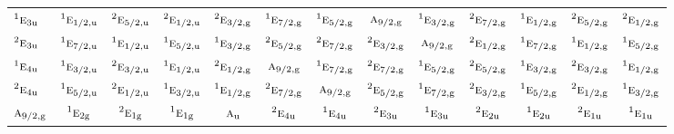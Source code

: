 \documentclass[10pt,a4paper]{article}
\numberwithin{equation}{section}
\newcommand{\irr}[1]{\text{\normalfont\scshape #1}}
\newcommand{\conjpair}[1]{{}^{#1}}
\newcommand{\ptag}[1]{\mathrm{#1}}
\begin{document}
{\begin{longtable}{@{}lcccccccccccc@{}}
$\conjpair{1}\irr{e}_{3\ptag{u}}$ & $\conjpair{1}\irr{e}_{1/2,\ptag{u}}$ & $\conjpair{2}\irr{e}_{5/2,\ptag{u}}$ & $\conjpair{2}\irr{e}_{1/2,\ptag{u}}$ & $\conjpair{2}\irr{e}_{3/2,\ptag{g}}$ & $\conjpair{1}\irr{e}_{7/2,\ptag{g}}$ & $\conjpair{1}\irr{e}_{5/2,\ptag{g}}$ & $\irr{a}_{9/2,\ptag{g}}$ & $\conjpair{1}\irr{e}_{3/2,\ptag{g}}$ & $\conjpair{2}\irr{e}_{7/2,\ptag{g}}$ & $\conjpair{1}\irr{e}_{1/2,\ptag{g}}$ & $\conjpair{2}\irr{e}_{5/2,\ptag{g}}$ & $\conjpair{2}\irr{e}_{1/2,\ptag{g}}$\\
$\conjpair{2}\irr{e}_{3\ptag{u}}$ & $\conjpair{1}\irr{e}_{7/2,\ptag{u}}$ & $\conjpair{1}\irr{e}_{1/2,\ptag{u}}$ & $\conjpair{1}\irr{e}_{5/2,\ptag{u}}$ & $\conjpair{1}\irr{e}_{3/2,\ptag{g}}$ & $\conjpair{2}\irr{e}_{5/2,\ptag{g}}$ & $\conjpair{2}\irr{e}_{7/2,\ptag{g}}$ & $\conjpair{2}\irr{e}_{3/2,\ptag{g}}$ & $\irr{a}_{9/2,\ptag{g}}$ & $\conjpair{2}\irr{e}_{1/2,\ptag{g}}$ & $\conjpair{1}\irr{e}_{7/2,\ptag{g}}$ & $\conjpair{1}\irr{e}_{1/2,\ptag{g}}$ & $\conjpair{1}\irr{e}_{5/2,\ptag{g}}$\\
$\conjpair{1}\irr{e}_{4\ptag{u}}$ & $\conjpair{1}\irr{e}_{3/2,\ptag{u}}$ & $\conjpair{2}\irr{e}_{3/2,\ptag{u}}$ & $\conjpair{1}\irr{e}_{1/2,\ptag{u}}$ & $\conjpair{2}\irr{e}_{1/2,\ptag{g}}$ & $\irr{a}_{9/2,\ptag{g}}$ & $\conjpair{1}\irr{e}_{7/2,\ptag{g}}$ & $\conjpair{2}\irr{e}_{7/2,\ptag{g}}$ & $\conjpair{1}\irr{e}_{5/2,\ptag{g}}$ & $\conjpair{2}\irr{e}_{5/2,\ptag{g}}$ & $\conjpair{1}\irr{e}_{3/2,\ptag{g}}$ & $\conjpair{2}\irr{e}_{3/2,\ptag{g}}$ & $\conjpair{1}\irr{e}_{1/2,\ptag{g}}$\\
$\conjpair{2}\irr{e}_{4\ptag{u}}$ & $\conjpair{1}\irr{e}_{5/2,\ptag{u}}$ & $\conjpair{2}\irr{e}_{1/2,\ptag{u}}$ & $\conjpair{1}\irr{e}_{3/2,\ptag{u}}$ & $\conjpair{1}\irr{e}_{1/2,\ptag{g}}$ & $\conjpair{2}\irr{e}_{7/2,\ptag{g}}$ & $\irr{a}_{9/2,\ptag{g}}$ & $\conjpair{2}\irr{e}_{5/2,\ptag{g}}$ & $\conjpair{1}\irr{e}_{7/2,\ptag{g}}$ & $\conjpair{2}\irr{e}_{3/2,\ptag{g}}$ & $\conjpair{1}\irr{e}_{5/2,\ptag{g}}$ & $\conjpair{2}\irr{e}_{1/2,\ptag{g}}$ & $\conjpair{1}\irr{e}_{3/2,\ptag{g}}$\\
$\irr{a}_{9/2,\ptag{g}}$ & $\conjpair{1}\irr{e}_{2\ptag{g}}$ & $\conjpair{2}\irr{e}_{1\ptag{g}}$ & $\conjpair{1}\irr{e}_{1\ptag{g}}$ & $\irr{a}_{\ptag{u}}$ & $\conjpair{2}\irr{e}_{4\ptag{u}}$ & $\conjpair{1}\irr{e}_{4\ptag{u}}$ & $\conjpair{2}\irr{e}_{3\ptag{u}}$ & $\conjpair{1}\irr{e}_{3\ptag{u}}$ & $\conjpair{2}\irr{e}_{2\ptag{u}}$ & $\conjpair{1}\irr{e}_{2\ptag{u}}$ & $\conjpair{2}\irr{e}_{1\ptag{u}}$ & $\conjpair{1}\irr{e}_{1\ptag{u}}$\\

\end{longtable}}
\end{document}
